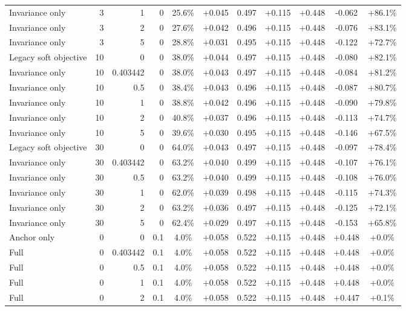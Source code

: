 \begin{table}[htbp]
\begin{tabular}{lrrrccccccc}
Invariance only & 3 & 1 & 0 & 25.6\% & +0.045 & 0.497 & +0.115 & +0.448 & -0.062 & +86.1\% \\
Invariance only & 3 & 2 & 0 & 27.6\% & +0.042 & 0.496 & +0.115 & +0.448 & -0.076 & +83.1\% \\
Invariance only & 3 & 5 & 0 & 28.8\% & +0.031 & 0.495 & +0.115 & +0.448 & -0.122 & +72.7\% \\
Legacy soft objective & 10 & 0 & 0 & 38.0\% & +0.044 & 0.497 & +0.115 & +0.448 & -0.080 & +82.1\% \\
Invariance only & 10 & 0.403442 & 0 & 38.0\% & +0.043 & 0.497 & +0.115 & +0.448 & -0.084 & +81.2\% \\
Invariance only & 10 & 0.5 & 0 & 38.4\% & +0.043 & 0.496 & +0.115 & +0.448 & -0.087 & +80.7\% \\
Invariance only & 10 & 1 & 0 & 38.8\% & +0.042 & 0.496 & +0.115 & +0.448 & -0.090 & +79.8\% \\
Invariance only & 10 & 2 & 0 & 40.8\% & +0.037 & 0.496 & +0.115 & +0.448 & -0.113 & +74.7\% \\
Invariance only & 10 & 5 & 0 & 39.6\% & +0.030 & 0.495 & +0.115 & +0.448 & -0.146 & +67.5\% \\
Legacy soft objective & 30 & 0 & 0 & 64.0\% & +0.043 & 0.497 & +0.115 & +0.448 & -0.097 & +78.4\% \\
Invariance only & 30 & 0.403442 & 0 & 63.2\% & +0.040 & 0.499 & +0.115 & +0.448 & -0.107 & +76.1\% \\
Invariance only & 30 & 0.5 & 0 & 63.2\% & +0.040 & 0.499 & +0.115 & +0.448 & -0.108 & +76.0\% \\
Invariance only & 30 & 1 & 0 & 62.0\% & +0.039 & 0.498 & +0.115 & +0.448 & -0.115 & +74.3\% \\
Invariance only & 30 & 2 & 0 & 63.2\% & +0.036 & 0.497 & +0.115 & +0.448 & -0.125 & +72.1\% \\
Invariance only & 30 & 5 & 0 & 62.4\% & +0.029 & 0.497 & +0.115 & +0.448 & -0.153 & +65.8\% \\
Anchor only & 0 & 0 & 0.1 & 4.0\% & +0.058 & 0.522 & +0.115 & +0.448 & +0.448 & +0.0\% \\
Full & 0 & 0.403442 & 0.1 & 4.0\% & +0.058 & 0.522 & +0.115 & +0.448 & +0.448 & +0.0\% \\
Full & 0 & 0.5 & 0.1 & 4.0\% & +0.058 & 0.522 & +0.115 & +0.448 & +0.448 & +0.0\% \\
Full & 0 & 1 & 0.1 & 4.0\% & +0.058 & 0.522 & +0.115 & +0.448 & +0.448 & +0.0\% \\
Full & 0 & 2 & 0.1 & 4.0\% & +0.058 & 0.522 & +0.115 & +0.448 & +0.447 & +0.1\% \\

\end{tabular}
\end{table}
